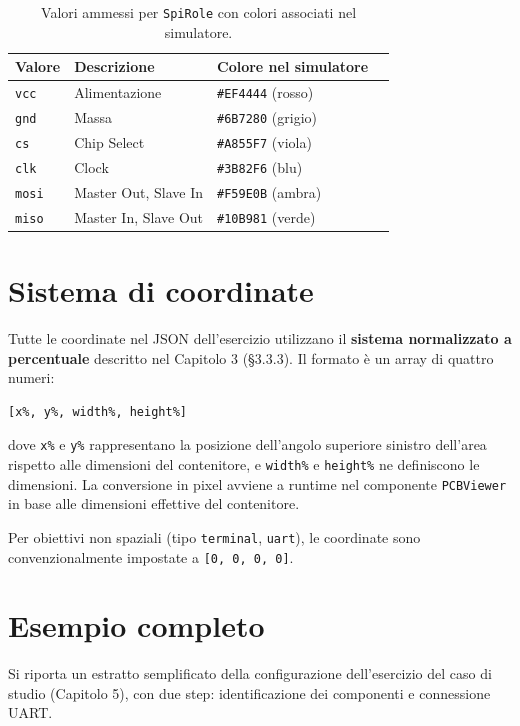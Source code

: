 \begin{table}[H]
\centering
\begin{tabular}{llll}
\toprule
\textbf{Valore} & \textbf{Descrizione} & \textbf{Colore nel simulatore} \\
\midrule
\texttt{vcc} & Alimentazione & \texttt{\#EF4444} (rosso) \\
\texttt{gnd} & Massa & \texttt{\#6B7280} (grigio) \\
\texttt{cs} & Chip Select & \texttt{\#A855F7} (viola) \\
\texttt{clk} & Clock & \texttt{\#3B82F6} (blu) \\
\texttt{mosi} & Master Out, Slave In & \texttt{\#F59E0B} (ambra) \\
\texttt{miso} & Master In, Slave Out & \texttt{\#10B981} (verde) \\
\bottomrule
\end{tabular}
\caption{Valori ammessi per \texttt{SpiRole} con colori associati nel simulatore.}
\label{tab:spi-role}
\end{table}


\section{Sistema di coordinate}

Tutte le coordinate nel JSON dell'esercizio utilizzano il \textbf{sistema normalizzato a percentuale} descritto nel Capitolo 3 (\S 3.3.3). Il formato è un array di quattro numeri:

\begin{lstlisting}
[x%, y%, width%, height%]
\end{lstlisting}

\noindent dove \texttt{x\%} e \texttt{y\%} rappresentano la posizione dell'angolo superiore sinistro dell'area rispetto alle dimensioni del contenitore, e \texttt{width\%} e \texttt{height\%} ne definiscono le dimensioni. La conversione in pixel avviene a runtime nel componente \texttt{PCBViewer} in base alle dimensioni effettive del contenitore.

Per obiettivi non spaziali (tipo \texttt{terminal}, \texttt{uart}), le coordinate sono convenzionalmente impostate a \texttt{[0, 0, 0, 0]}.


\section{Esempio completo}

Si riporta un estratto semplificato della configurazione dell'esercizio del caso di studio (Capitolo 5), con due step: identificazione dei componenti e connessione UART.

